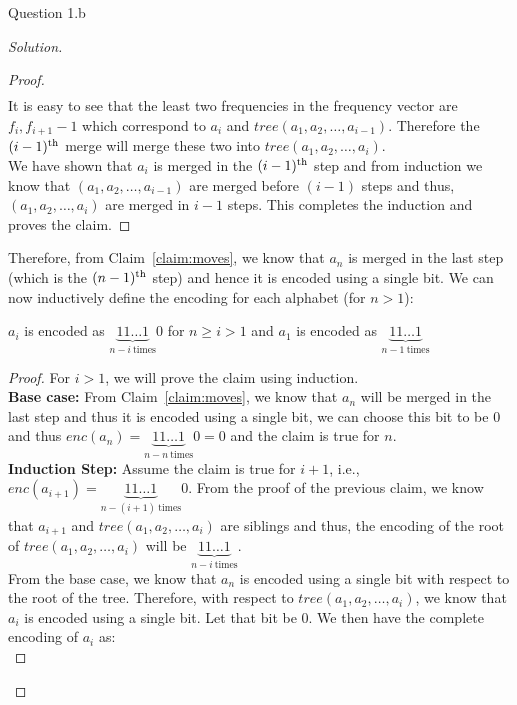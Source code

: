 \begin{solution}{Question 1.b}
\begin{proof}[Solution]
\begin{proof}
\begin{equation}
\begin{split}
                \end{split}
            \end{equation}
            It is easy to see that the least two frequencies in the frequency vector are $f_i, f_{i+1}-1$ which correspond to $a_i$ and $tree(a_1, a_2, \ldots, a_{i-1})$. Therefore the $(i-1)\textsuperscript{th}$ merge will merge these two into $tree(a_1, a_2, \ldots, a_{i})$.\\
            We have shown that $a_i$ is merged in the $(i-1)\textsuperscript{th}$ step and from induction we know that $(a_1, a_2, \ldots, a_{i-1})$ are merged before $(i-1)$ steps and thus, $(a_1, a_2, \ldots, a_i)$ are merged in $i-1$ steps. This completes the induction and proves the claim.
        \end{proof}
        Therefore, from Claim~\ref{claim:moves}, we know that $a_n$ is merged in the last step (which is the $(n-1)\textsuperscript{th}$ step) and hence it is encoded using a single bit. We can now inductively define the encoding for each alphabet (for $n>1$):
        \begin{claim}\label{claim:fibhufans}
            $a_i$ is encoded as $\underbrace{11\ldots1}_{n-i\ \text{times}}0$ for $n\geq i>1$ and $a_1$ is encoded as $\underbrace{11\ldots1}_{n-1\ \text{times}}$
        \end{claim}
        \begin{proof}
            For $i>1$, we will prove the claim using induction.\\
            \textbf{Base case:} From Claim~\ref{claim:moves}, we know that $a_n$ will be merged in the last step and thus it is encoded using a single bit, we can choose this bit to be $0$ and thus $enc(a_n)=\underbrace{11\ldots1}_{n-n\ \text{times}}0=0$ and the claim is true for $n$.\\
            \textbf{Induction Step:} Assume the claim is true for $i+1$, i.e., $enc(a_{i+1})=\underbrace{11\ldots1}_{n-(i+1)\ \text{times}}0$. From the proof of the previous claim, we know that $a_{i+1}$ and $tree(a_1, a_2, \ldots, a_i)$ are siblings and thus, the encoding of the root of $tree(a_1, a_2, \ldots, a_i)$ will be $\underbrace{11\ldots1}_{n-i\ \text{times}}$.\\
            From the base case, we know that $a_n$ is encoded using a single bit with respect to the root of the tree. Therefore, with respect to $tree(a_1, a_2, \ldots, a_i)$, we know that $a_i$ is encoded using a single bit. Let that bit be $0$. We then have the complete encoding of $a_i$ as:
            \begin{equation}

\end{equation}
\end{proof}
\end{proof}
\end{solution}
